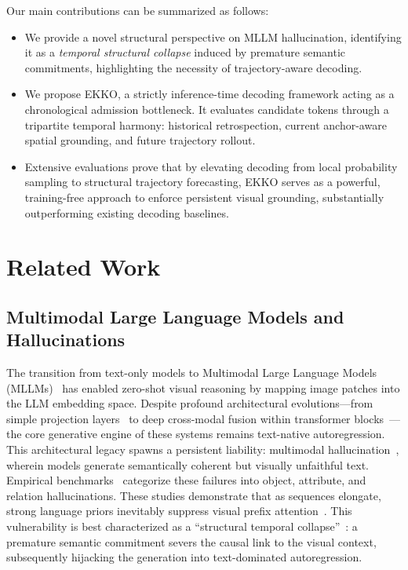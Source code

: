 Our main contributions can be summarized as follows:
\begin{itemize}
    \item We provide a novel structural perspective on MLLM hallucination, identifying it as a \textit{temporal structural collapse} induced by premature semantic commitments, highlighting the necessity of trajectory-aware decoding.
    \item We propose EKKO, a strictly inference-time decoding framework acting as a chronological admission bottleneck. It evaluates candidate tokens through a tripartite temporal harmony: historical retrospection, current anchor-aware spatial grounding, and future trajectory rollout.
    \item Extensive evaluations prove that by elevating decoding from local probability sampling to structural trajectory forecasting, EKKO serves as a powerful, training-free approach to enforce persistent visual grounding, substantially outperforming existing decoding baselines.
\end{itemize}






\section{Related Work}
\label{sec:related_work}

\subsection{Multimodal Large Language Models and Hallucinations}

The transition from text-only models to Multimodal Large Language Models (MLLMs)~\cite{liu2023improvedllava,instructblip,bai2023qwen,wang2023cogvlm,zhu2023minigpt} has enabled zero-shot visual reasoning by mapping image patches into the LLM embedding space. Despite profound architectural evolutions---from simple projection layers~\cite{liu2023improvedllava} to deep cross-modal fusion within transformer blocks~\cite{wang2023cogvlm,zhu2023minigpt}---the core generative engine of these systems remains text-native autoregression. This architectural legacy spawns a persistent liability: multimodal hallucination~\cite{bai2025mllm_hallucination_survey,zhou2023analyzing}, wherein models generate semantically coherent but visually unfaithful text. Empirical benchmarks~\cite{guan2024hallusionbench,li2023pope,rohrbach2018object,anonymous2026_mioh,dong2025mirage} categorize these failures into object, attribute, and relation hallucinations. These studies demonstrate that as sequences elongate, strong language priors inevitably suppress visual prefix attention~\cite{anonymous2025_visual_attention_sink}. This vulnerability is best characterized as a ``structural temporal collapse''~\cite{zhou2023analyzing}: a premature semantic commitment severs the causal link to the visual context, subsequently hijacking the generation into text-dominated autoregression.

